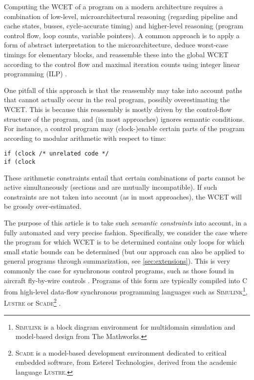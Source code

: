 \documentclass[a4paper,twocolumn,11pt]{article}
\newcommand{\RegTM}{\texttrademark}
\begin{document}
Computing the WCET of a program on a modern architecture requires a combination of low-level, microarchitectural reasoning (regarding pipeline and cache states, busses, cycle-accurate timing) and higher-level reasoning (program control flow, loop counts, variable pointers).
A common approach is to apply a form of abstract interpretation to the microarchitecture, deduce worst-case timings for elementary blocks, and reassemble these into the global WCET according to the control flow and maximal iteration counts using integer linear programming (ILP) \parencite{Theiling_et_al_2000,wilhelm-et-TECS08}.


One pitfall of this approach is that the reassembly may take into account paths that cannot actually occur in the real program, possibly overestimating the WCET.
This is because this reassembly is mostly driven by the control-flow structure of the program, and (in most approaches) ignores semantic conditions.
For instance, a control program may (clock-)enable certain parts of the program according to modular arithmetic with respect to time:
\begin{lstlisting}
if (clock /* unrelated code */
if (clock \end{lstlisting}
These arithmetic constraints entail that certain combinations of parts cannot be active simultaneously (sections  and  are mutually incompatible).
If such constraints are not taken into account (as in most approaches), the WCET will be grossly over-estimated.

The purpose of this article is to take such \emph{semantic constraints} into account, in a fully automated and very precise fashion.
Specifically, we consider the case where the program for which WCET is to be determined contains only loops for which small static bounds can be determined (but our approach can also be applied to general programs through summarization, see \autoref{sec:extensions}).
This is very commonly the case for synchronous control programs, such as those found in aircraft fly-by-wire controls \parencite{Souyris_et_al_FM2009}.
Programs of this form are typically compiled into C from high-level data-flow synchronous programming languages such as \textsc{Simulink}\footnote{\textsc{Simulink}{\RegTM} is a block diagram environment for multidomain simulation and model-based design from The Mathworks.},
\textsc{Lustre} or
\textsc{Scade}\footnote{\textsc{Scade}{\RegTM} is a model-based development environment dedicated to critical embedded software, from Esterel Technologies, derived from the academic language \textsc{Lustre}.}
\parencite{Caspi_et_al_Synchronous_2008}.
\end{document}
